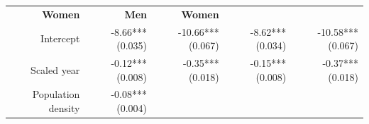 \documentclass[]{article}
\begin{document}
\begin{longtable}[c]{@{}rrrrr@{}}
\begin{minipage}[t]{0.16\columnwidth}
\textbf{Women}
\strut\end{minipage} &
\begin{minipage}[t]{0.21\columnwidth}\raggedleft\strut
\textbf{Men}
\strut\end{minipage} &
\begin{minipage}[t]{0.15\columnwidth}\raggedleft\strut
\textbf{Women}
\strut\end{minipage}\tabularnewline
\begin{minipage}[t]{0.17\columnwidth}\raggedleft\strut
Intercept
\strut\end{minipage} &
\begin{minipage}[t]{0.18\columnwidth}\raggedleft\strut
-8.66*** (0.035)
\strut\end{minipage} &
\begin{minipage}[t]{0.16\columnwidth}\raggedleft\strut
-10.66*** (0.067)
\strut\end{minipage} &
\begin{minipage}[t]{0.21\columnwidth}\raggedleft\strut
-8.62*** (0.034)
\strut\end{minipage} &
\begin{minipage}[t]{0.15\columnwidth}\raggedleft\strut
-10.58*** (0.067)
\strut\end{minipage}\tabularnewline
\begin{minipage}[t]{0.17\columnwidth}\raggedleft\strut
Scaled year
\strut\end{minipage} &
\begin{minipage}[t]{0.18\columnwidth}\raggedleft\strut
-0.12*** (0.008)
\strut\end{minipage} &
\begin{minipage}[t]{0.16\columnwidth}\raggedleft\strut
-0.35*** (0.018)
\strut\end{minipage} &
\begin{minipage}[t]{0.21\columnwidth}\raggedleft\strut
-0.15*** (0.008)
\strut\end{minipage} &
\begin{minipage}[t]{0.15\columnwidth}\raggedleft\strut
-0.37*** (0.018)
\strut\end{minipage}\tabularnewline
\begin{minipage}[t]{0.17\columnwidth}\raggedleft\strut
Population density
\strut\end{minipage} &
\begin{minipage}[t]{0.18\columnwidth}\raggedleft\strut
-0.08*** (0.004)
\strut\end{minipage} &
\begin{minipage}[t]{0.16\columnwidth}\raggedleft\strut

\end{minipage}
\end{longtable}
\end{document}
